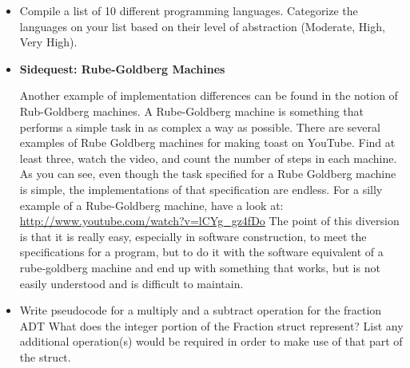 \begin{itemize}

\item  Compile a list of 10 different programming languages. Categorize the languages on your list based on their level of abstraction (Moderate, High, Very High).

\item  {\textbf{Sidequest: Rube-Goldberg Machines}

Another example of implementation differences can be found in the notion of Rub-Goldberg machines. A Rube-Goldberg machine is something that performs a simple task in as complex a way as possible.
There are several examples of Rube Goldberg machines for making toast on YouTube. Find at least three, watch the video, and count the number of steps in each machine.
As you can see, even though the task specified for a Rube Goldberg machine is simple, the implementations of that specification are endless.
For a silly example of a Rube-Goldberg machine, have a look at: \url{http://www.youtube.com/watch?v=lCYg_gz4fDo}
The point of this diversion is that it is really easy, especially in software construction, to meet the specifications for a program, but to do it with the software equivalent of a rube-goldberg machine and end up with something that works, but is not easily understood and is difficult to maintain.}

\item  Write pseudocode for a multiply and a subtract operation for the fraction ADT
What does the integer portion of the Fraction struct represent? List any additional operation(s) would be required in order to make use of that part of the struct.

 \end{itemize}